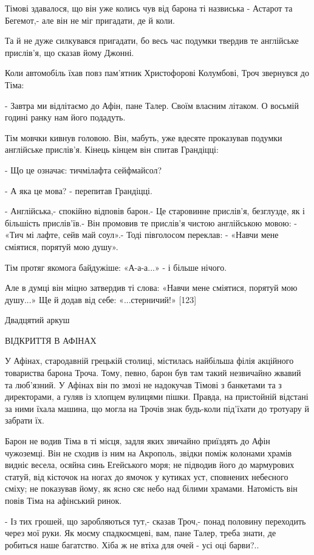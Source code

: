 Тімові здавалося, що він уже колись чув від барона ті назвиська - Астарот та Бегемот,- але він не міг пригадати, де й коли.

Та й не дуже силкувався пригадати, бо весь час подумки твердив те англійське прислів'я, що сказав йому Джонні.

Коли автомобіль їхав повз пам'ятник Христофорові Колумбові, Троч звернувся до Тіма:

- Завтра ми відлітаємо до Афін, пане Талер. Своїм власним літаком. О восьмій годині ранку нам його подадуть.

Тім мовчки кивнув головою. Він, мабуть, уже вдесяте проказував подумки англійське прислів'я. Кінець кінцем він спитав Грандіцці:

- Що це означає: тичмілафта сейфмайсол?

- А яка це мова? - перепитав Грандіцці.

- Англійська,- спокійно відповів барон.- Це старовинне прислів'я, безглузде, як і більшість прислів'їв.- Він промовив те прислів'я чистою англійською мовою: - «Тич мі лафте, сейв май соул».- Тоді півголосом переклав: - «Навчи мене сміятися, порятуй мою душу».

Тім протяг якомога байдужіше: «А-а-а...» - і більше нічого.

Але в думці він міцно затвердив ті слова: «Навчи мене сміятися, порятуй мою душу...» Ще й додав від себе: «...стерничий!» [123]

Двадцятий аркуш

ВІДКРИТТЯ В АФІНАХ

У Афінах, стародавній грецькій столиці, містилась найбільша філія акційного товариства барона Троча. Тому, певно, барон був там такий незвичайно жвавий та люб'язний. У Афінах він по змозі не надокучав Тімові з банкетами та з директорами, а гуляв із хлопцем вулицями пішки. Правда, на пристойній відстані за ними їхала машина, що могла на Трочів знак будь-коли під'їхати до тротуару й забрати їх.

Барон не водив Тіма в ті місця, задля яких звичайно приїздять до Афін чужоземці. Він не сходив із ним на Акрополь, звідки поміж колонами храмів видніє весела, осяйна синь Егейського моря; не підводив його до мармурових статуй, від кісточок на ногах до ямочок у кутиках уст, сповнених небесного сміху; не показував йому, як ясно сяє небо над білими храмами. Натомість він повів Тіма на афінський ринок.

- Із тих грошей, що заробляються тут,- сказав Троч,- понад половину переходить через мої руки. Як моєму спадкоємцеві, вам, пане Талер, треба знати, де робиться наше багатство. Хіба ж не втіха для очей - усі оці барви?..

